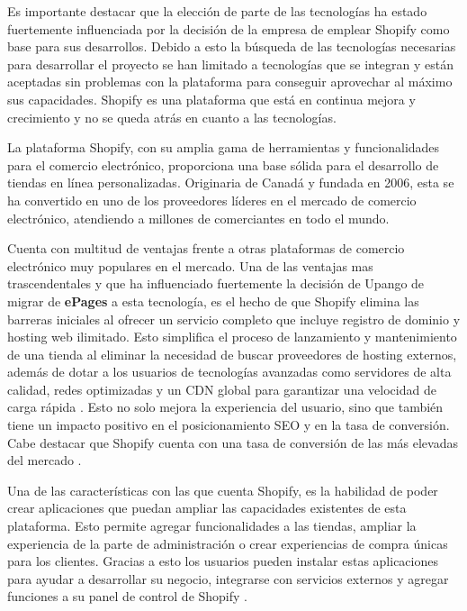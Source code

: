 \documentclass[12pt]{article}
\begin{document}
Es importante destacar que la elección de parte de las tecnologías ha estado fuertemente influenciada por la decisión de la empresa de emplear Shopify
como base para sus desarrollos. Debido a esto la búsqueda de las tecnologías necesarias para desarrollar el proyecto se han limitado a
tecnologías que se integran y están aceptadas sin problemas con la plataforma para conseguir aprovechar al máximo sus capacidades. Shopify es una plataforma que está en continua mejora y crecimiento y no se queda atrás en cuanto a las tecnologías.

La plataforma Shopify, con su amplia gama de herramientas y funcionalidades para el comercio electrónico, 
proporciona una base sólida para el desarrollo de tiendas en línea personalizadas. Originaria de Canadá y 
fundada en 2006, esta se ha convertido en uno de los proveedores líderes en el mercado de comercio electrónico, 
atendiendo a millones de comerciantes en todo el mundo. 

Cuenta con multitud de ventajas frente a otras plataformas de comercio electrónico muy populares en el mercado. Una de las ventajas
mas trascendentales y que ha influenciado fuertemente  la decisión de Upango de migrar de \textbf{ePages} a esta tecnología, es el hecho de que Shopify elimina
las barreras iniciales al ofrecer un servicio completo que incluye registro de dominio y hosting web ilimitado. Esto simplifica el proceso de lanzamiento y mantenimiento
de una tienda al eliminar la necesidad de buscar proveedores de hosting externos, además de dotar a los usuarios de tecnologías avanzadas como servidores de alta
calidad, redes optimizadas y un CDN global para garantizar una velocidad de carga rápida \cite{shopify-tutorial}. Esto no solo mejora la experiencia del usuario, sino que también 
tiene un impacto positivo en el posicionamiento SEO y en la tasa de conversión. Cabe destacar que Shopify cuenta con una tasa de conversión de las más
elevadas del mercado \cite{shopify-tasa-conversion}. 

Una de las características con las que cuenta Shopify, es la habilidad de poder crear aplicaciones que puedan ampliar las capacidades existentes 
de esta plataforma. Esto permite agregar funcionalidades a las tiendas, ampliar la experiencia de la parte de administración
o crear experiencias de compra únicas para los clientes. Gracias a esto los usuarios pueden instalar estas aplicaciones para ayudar a desarrollar
su negocio, integrarse con servicios externos y agregar funciones a su panel de control de Shopify \cite{shopify-dev}. 
\end{document}
